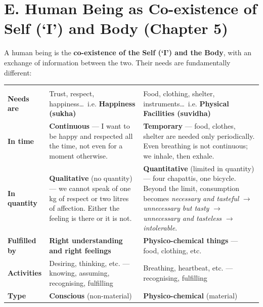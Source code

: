 \section{E. Human Being as Co-existence of Self (`I') and Body (Chapter 5)}


\ans A human being is the \textbf{co-existence of the Self (`I') and the
Body}, with an exchange of information between the two. Their needs are
fundamentally different:

\renewcommand{\arraystretch}{1.3}
\begin{longtable}{P{22mm} P{63mm} P{63mm}}
\hdr{} &  &  \\ \hline \endfirsthead
{}\hdr{} &  &  \\ \hline \endhead
\textbf{Needs are} & Trust, respect, happiness\ldots\ i.e.
  \textbf{Happiness (sukha)} &
  Food, clothing, shelter, instruments\ldots\ i.e. \textbf{Physical Facilities
  (suvidha)} \\ \hline
\textbf{In time} & \textbf{Continuous} --- I want to be happy and respected
  all the time, not even for a moment otherwise. &
  \textbf{Temporary} --- food, clothes, shelter are needed only periodically.
  Even breathing is not continuous; we inhale, then exhale. \\ \hline
\textbf{In quantity} & \textbf{Qualitative} (no quantity) --- we cannot speak
  of one kg of respect or two litres of affection. Either the feeling is there
  or it is not. &
  \textbf{Quantitative} (limited in quantity) --- four chapattis, one bicycle.
  Beyond the limit, consumption becomes \emph{necessary and tasteful}
  $\rightarrow$ \emph{unnecessary but tasty} $\rightarrow$ \emph{unnecessary
  and tasteless} $\rightarrow$ \emph{intolerable}. \\ \hline
\textbf{Fulfilled by} & \textbf{Right understanding and right feelings} &
  \textbf{Physico-chemical things} --- food, clothing, etc. \\ \hline
\textbf{Activities} & Desiring, thinking, etc. --- knowing, assuming,
  recognising, fulfilling &
  Breathing, heartbeat, etc. --- recognising, fulfilling \\ \hline
\textbf{Type} & \textbf{Conscious} (non-material) &
  \textbf{Physico-chemical} (material) \\ \hline
\end{longtable}

